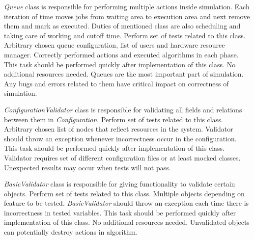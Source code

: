 	{
		{
			\emph{Queue} class is responsible for performing multiple actions inside simulation. Each iteration of time moves jobs from waiting area to execution area and next remove them and mark as executed. Duties of mentioned class are also scheduling and taking care of working and cutoff time.
		}
		{
			Perform set of tests related to this class. 
		}
		{
			Arbitrary chosen queue configuration, list of users and hardware resource manager.  
		}
		{
			Correctly performed actions and executed algorithms in each phase.
		}
		{
			This task should be performed quickly after implementation of this class.
		}
		{
			No additional resources needed.
		}
		{
			Queues are the most important part of simulation. Any bugs and errors related to them have critical impact on correctness of simulation.
		}
	}

	{
		{
			\emph{ConfigurationValidator} class is responsible for validating all fields and relations between them in \emph{Configuration}.
		}
		{
			Perform set of tests related to this class. 
		}
		{
			Arbitrary chosen list of nodes that reflect resources in the system.   
		}
		{
			Validator should throw an exception whenever incorrectness occur in the configuration.
		}
		{
			This task should be performed quickly after implementation of this class.
		}
		{
			Validator requires set of different configuration files or at least mocked classes.
		}
		{
			Unexpected results may occur when tests will not pass. 
		}
	}

	{
		{
			\emph{BasicValidator} class is responsible for giving functionality to validate certain objects.
		}
		{
			Perform set of tests related to this class. 
		}
		{
			Multiple objects depending on feature to be tested.
		}
		{
			\emph{BasicValidator} should throw an exception each time there is incorrectness in tested variables. 
		}
		{
			This task should be performed quickly after implementation of this class.
		}
		{
			No additional resources needed.
		}
		{
			Unvalidated objects can potentially destroy actions in algorithm. 
		}
	}

